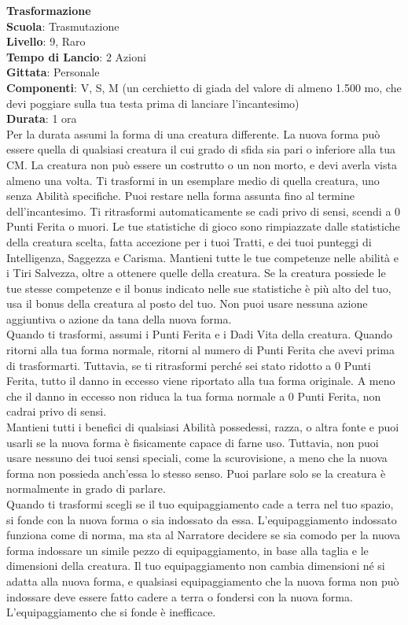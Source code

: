 \begin{multicols}{2}
\medskip\textbf{Trasformazione}\\
\textbf{Scuola}: Trasmutazione\\
\textbf{Livello}: 9, Raro\\
\textbf{Tempo di Lancio}: 2 Azioni\\
\textbf{Gittata}: Personale\\
\textbf{Componenti}: V, S, M (un cerchietto di giada del valore di almeno 1.500 mo, che devi poggiare sulla tua testa prima di lanciare l'incantesimo)\\
\textbf{Durata}: 1 ora\\
Per la durata assumi la forma di una creatura differente. La nuova forma può essere quella di qualsiasi creatura il cui grado di sfida sia pari o inferiore alla tua CM. La creatura non può essere un costrutto o un non morto, e devi averla vista almeno una volta. Ti trasformi in un esemplare medio di quella creatura, uno senza Abilità specifiche. Puoi restare nella forma assunta fino al termine dell'incantesimo. Ti ritrasformi automaticamente se cadi privo di sensi, scendi a 0 Punti Ferita o muori. Le tue statistiche di gioco sono rimpiazzate dalle statistiche della creatura scelta, fatta accezione per i tuoi Tratti, e dei tuoi punteggi di Intelligenza, Saggezza e Carisma. Mantieni tutte le tue competenze nelle abilità e i Tiri Salvezza, oltre a ottenere quelle della creatura. Se la creatura possiede le tue stesse competenze e il bonus indicato nelle sue statistiche è più alto del tuo, usa il bonus della creatura al posto del tuo. Non puoi usare nessuna azione aggiuntiva o azione da tana della nuova forma.\\
Quando ti trasformi, assumi i Punti Ferita e i Dadi Vita della creatura. Quando ritorni alla tua forma normale, ritorni al numero di Punti Ferita che avevi prima di trasformarti. Tuttavia, se ti ritrasformi perché sei stato ridotto a 0 Punti Ferita, tutto il danno in eccesso viene riportato alla tua forma originale. A meno che il danno in eccesso non riduca la tua forma normale a 0 Punti Ferita, non cadrai privo di sensi. \\
Mantieni tutti i benefici di qualsiasi Abilità possedessi, razza, o altra fonte e puoi usarli se la nuova forma è fisicamente capace di farne uso. Tuttavia, non puoi usare nessuno dei tuoi sensi speciali, come la scurovisione, a meno che la nuova forma non possieda anch'essa lo stesso senso. Puoi parlare solo se la creatura è normalmente in grado di parlare.\\
Quando ti trasformi scegli se il tuo equipaggiamento cade a terra nel tuo spazio, si fonde con la nuova forma o sia indossato da essa. L'equipaggiamento indossato funziona come di norma, ma sta al Narratore decidere se sia comodo per la nuova forma indossare un simile pezzo di equipaggiamento, in base alla taglia e le dimensioni della creatura. Il tuo equipaggiamento non cambia dimensioni né si adatta alla nuova forma, e qualsiasi equipaggiamento che la nuova forma non può indossare deve essere fatto cadere a terra o fondersi con la nuova forma. L'equipaggiamento che si fonde è inefficace.\\

\end{multicols}

